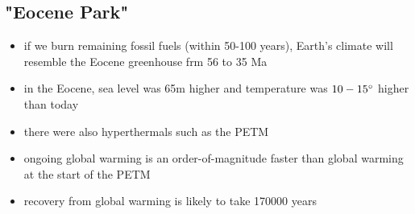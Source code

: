 \subsection{"Eocene Park"}

\begin{itemize}
	\item if we burn remaining fossil fuels (within 50-100 years), Earth's
	climate will resemble the Eocene greenhouse frm 56 to 35 Ma
	\item in the Eocene, sea level was 65m higher and temperature was
	$10-15 \degree$ higher than today
	\item there were also hyperthermals such as the PETM
	\item ongoing global warming is an order-of-magnitude faster than
	global warming at the start of the PETM
	\item recovery from global warming is likely to take 170000 years
\end{itemize}
